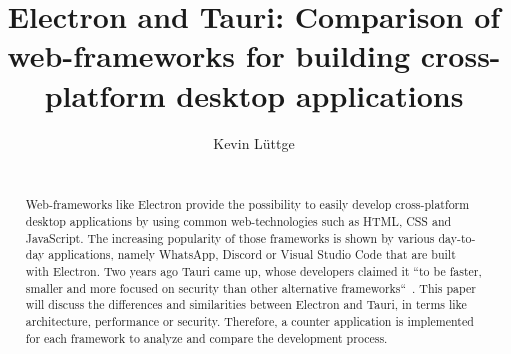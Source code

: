 \documentclass{acm_proc_article-sp}
\date{\displaydate{date}}
\begin{document}
    \title{{\ttlit Electron} and {\ttlit Tauri}: Comparison of web-frameworks for building cross-platform desktop applications}
    \author{
        \alignauthor
        Kevin L\"uttge \\
        \\
    }

    \maketitle

    \begin{abstract}
        Web-frameworks like Electron provide the possibility to easily develop cross-platform desktop applications by using common web-technologies
        such as \ac{HTML}, \ac{CSS} and JavaScript.
        The increasing popularity of those frameworks is shown by various day-to-day applications, namely WhatsApp, Discord or Visual Studio Code
        that are built with Electron.
        Two years ago Tauri came up, whose developers claimed it ``to be faster, smaller and more focused on security than other alternative frameworks``~\cite{tauri}.
        This paper will discuss the differences and similarities between Electron and Tauri, in terms like architecture, performance or security.
        Therefore, a counter application is implemented for each framework to analyze and compare the development process.
    \end{abstract}
    
    
    
    
    
    
    
    \newpage

    
    

    \balancecolumns
\end{document}

